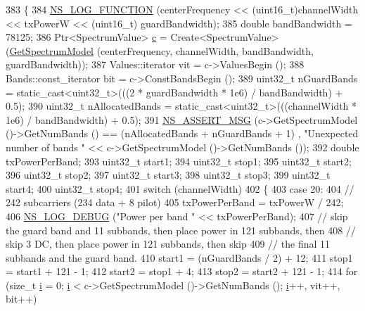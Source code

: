 \begin{DoxyCode}
383 \{
384   \hyperlink{log-macros-disabled_8h_a90b90d5bad1f39cb1b64923ea94c0761}{NS\_LOG\_FUNCTION} (centerFrequency << (uint16\_t)channelWidth << txPowerW << (uint16\_t)
      guardBandwidth);
385   \textcolor{keywordtype}{double} bandBandwidth = 78125;
386   Ptr<SpectrumValue> \hyperlink{lte_2model_2fading-traces_2fading__trace__generator_8m_ae0323a9039add2978bf5b49550572c7c}{c} = Create<SpectrumValue> (\hyperlink{classns3_1_1WifiSpectrumValueHelper_a09b58fb2741ff1a78ae6d952ad08b1bb}{GetSpectrumModel} (centerFrequency, 
      channelWidth, bandBandwidth, guardBandwidth));
387   Values::iterator vit = c->ValuesBegin ();
388   Bands::const\_iterator bit = c->ConstBandsBegin ();
389   uint32\_t nGuardBands = \textcolor{keyword}{static\_cast<}uint32\_t\textcolor{keyword}{>}(((2 * guardBandwidth * 1e6) / bandBandwidth) + 0.5);
390   uint32\_t nAllocatedBands = \textcolor{keyword}{static\_cast<}uint32\_t\textcolor{keyword}{>}(((channelWidth * 1e6) / bandBandwidth) + 0.5);
391   \hyperlink{assert_8h_aff5ece9066c74e681e74999856f08539}{NS\_ASSERT\_MSG} (c->GetSpectrumModel ()->GetNumBands () == (nAllocatedBands + nGuardBands + 1)
      , \textcolor{stringliteral}{"Unexpected number of bands "} << c->GetSpectrumModel ()->GetNumBands ());
392   \textcolor{keywordtype}{double} txPowerPerBand;
393   uint32\_t start1;
394   uint32\_t stop1;
395   uint32\_t start2;
396   uint32\_t stop2;
397   uint32\_t start3;
398   uint32\_t stop3;
399   uint32\_t start4;
400   uint32\_t stop4;
401   \textcolor{keywordflow}{switch} (channelWidth)
402     \{
403     \textcolor{keywordflow}{case} 20:
404       \textcolor{comment}{// 242 subcarriers (234 data + 8 pilot)}
405       txPowerPerBand = txPowerW / 242;
406       \hyperlink{group__logging_ga413f1886406d49f59a6a0a89b77b4d0a}{NS\_LOG\_DEBUG} (\textcolor{stringliteral}{"Power per band "} << txPowerPerBand);
407       \textcolor{comment}{// skip the guard band and 11 subbands, then place power in 121 subbands, then}
408       \textcolor{comment}{// skip 3 DC, then place power in 121 subbands, then skip}
409       \textcolor{comment}{// the final 11 subbands and the guard band.}
410       start1 = (nGuardBands / 2) + 12;
411       stop1 = start1 + 121 - 1;
412       start2 = stop1 + 4;
413       stop2 = start2 + 121 - 1;
414       \textcolor{keywordflow}{for} (\textcolor{keywordtype}{size\_t} \hyperlink{bernuolliDistribution_8m_a6f6ccfcf58b31cb6412107d9d5281426}{i} = 0; \hyperlink{bernuolliDistribution_8m_a6f6ccfcf58b31cb6412107d9d5281426}{i} < c->GetSpectrumModel ()->GetNumBands (); \hyperlink{bernuolliDistribution_8m_a6f6ccfcf58b31cb6412107d9d5281426}{i}++, vit++, bit++)

\end{DoxyCode}
